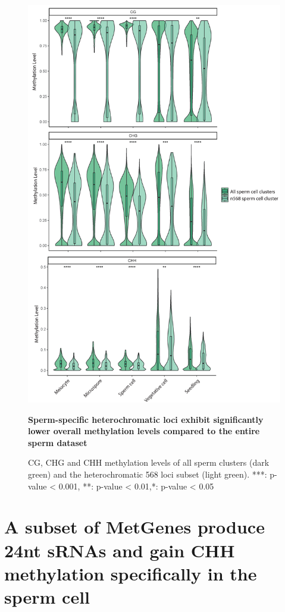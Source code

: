 \begin{figure}[htbp!] 
\centering    
    \includegraphics[width=1\textwidth]{Chapter2/Figs/Figure10_SC_hetero_clusters_methylation.pdf}
\caption{\textbf{Sperm-specific heterochromatic loci exhibit significantly lower overall methylation levels compared to the entire sperm dataset}}
\label{fig:SC_hetero_clusters}
\captionsetup{font=small}
    \caption*{CG, CHG and CHH methylation levels of all sperm clusters (dark green) and the heterochromatic 568 loci subset (light green). ***: p-value < 0.001, **: p-value < 0.01,*: p-value < 0.05}
\end{figure}

\section{A subset of MetGenes produce 24nt sRNAs and gain CHH methylation specifically in the sperm cell}

